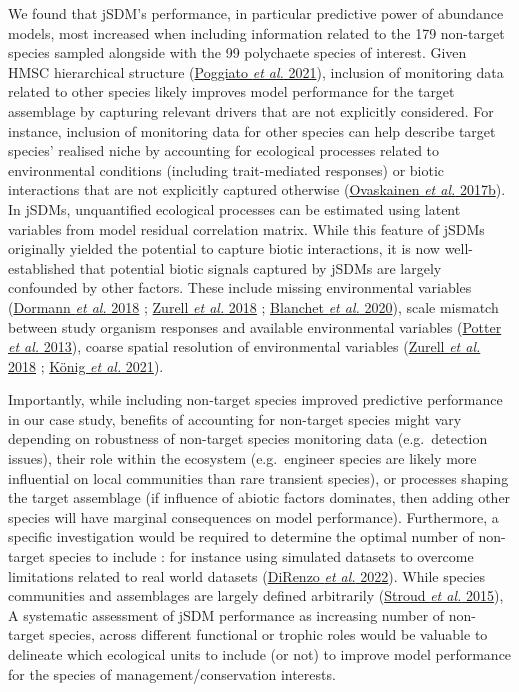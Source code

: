 \documentclass[9pt,biorxiv,doublespacing,lineno]{lapreprint}
\begin{document}
We found that jSDM's performance, in particular predictive power of
abundance models, most increased when including information related to
the 179 non-target species sampled alongside with the 99 polychaete
species of interest. Given HMSC hierarchical structure
(\protect\hyperlink{ref-Poggiato_2021}{Poggiato \emph{et al.} 2021}),
inclusion of monitoring data related to other species likely improves
model performance for the target assemblage by capturing relevant
drivers that are not explicitly considered. For instance, inclusion of
monitoring data for other species can help describe target species'
realised niche by accounting for ecological processes related to
environmental conditions (including trait-mediated responses) or biotic
interactions that are not explicitly captured otherwise
(\protect\hyperlink{ref-Ovaskainen_2017a}{Ovaskainen \emph{et al.}
2017b}). In jSDMs, unquantified ecological processes can be estimated
using latent variables from model residual correlation matrix. While
this feature of jSDMs originally yielded the potential to capture biotic
interactions, it is now well-established that potential biotic signals
captured by jSDMs are largely confounded by other factors. These include
missing environmental variables
(\protect\hyperlink{ref-Dormann_2018}{Dormann \emph{et al.} 2018} ;
\protect\hyperlink{ref-Zurell_2018}{Zurell \emph{et al.} 2018} ;
\protect\hyperlink{ref-Blanchet_2020}{Blanchet \emph{et al.} 2020}),
scale mismatch between study organism responses and available
environmental variables (\protect\hyperlink{ref-Potter_2013}{Potter
\emph{et al.} 2013}), coarse spatial resolution of environmental
variables (\protect\hyperlink{ref-Zurell_2018}{Zurell \emph{et al.}
2018} ; \protect\hyperlink{ref-Konig_2021}{König \emph{et al.} 2021}).

Importantly, while including non-target species improved predictive
performance in our case study, benefits of accounting for non-target
species might vary depending on robustness of non-target species
monitoring data (e.g.~detection issues), their role within the ecosystem
(e.g.~engineer species are likely more influential on local communities
than rare transient species), or processes shaping the target assemblage
(if influence of abiotic factors dominates, then adding other species
will have marginal consequences on model performance). Furthermore, a
specific investigation would be required to determine the optimal number
of non-target species to include : for instance using simulated datasets
to overcome limitations related to real world datasets
(\protect\hyperlink{ref-DiRenzo_2022}{DiRenzo \emph{et al.} 2022}).
While species communities and assemblages are largely defined
arbitrarily (\protect\hyperlink{ref-Stroud_2015}{Stroud \emph{et al.}
2015}), A systematic assessment of jSDM performance as increasing number
of non-target species, across different functional or trophic roles
would be valuable to delineate which ecological units to include (or
not) to improve model performance for the species of
management/conservation interests.
\end{document}
